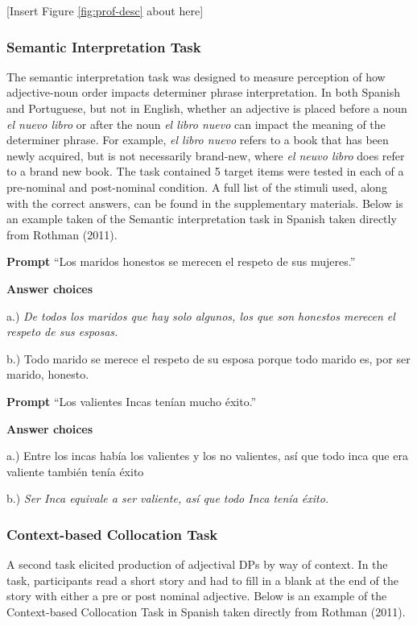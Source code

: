 \documentclass[
  man]{apa6}
\begin{document}
{[}Insert Figure \ref{fig:prof-desc} about here{]}

\hypertarget{semantic-interpretation-task}{%
\subsubsection{Semantic Interpretation Task}\label{semantic-interpretation-task}}

The semantic interpretation task was designed to measure perception of how adjective-noun order impacts determiner phrase interpretation.
In both Spanish and Portuguese, but not in English, whether an adjective is placed before a noun \emph{el nuevo libro} or after the noun \emph{el libro nuevo} can impact the meaning of the determiner phrase.
For example, \emph{el libro nuevo} refers to a book that has been newly acquired, but is not necessarily brand-new, where \emph{el neuvo libro} does refer to a brand new book.
The task contained 5 target items were tested in each of a pre-nominal and post-nominal condition.
A full list of the stimuli used, along with the correct answers, can be found in the supplementary materials.
Below is an example taken of the Semantic interpretation task in Spanish taken directly from Rothman (2011).

\textbf{Prompt}
``Los maridos honestos se merecen el respeto de sus mujeres.''

\textbf{Answer choices}

a.) \emph{De todos los maridos que hay solo algunos, los que son honestos merecen el respeto de sus esposas.}

b.) Todo marido se merece el respeto de su esposa porque todo marido es, por ser marido, honesto.

\textbf{Prompt}
``Los valientes Incas tenían mucho éxito.''

\textbf{Answer choices}

a.) Entre los incas había los valientes y los no valientes, así que todo inca que era valiente también tenía éxito

b.) \emph{Ser Inca equivale a ser valiente, así que todo Inca tenía éxito.}

\hypertarget{context-based-collocation-task}{%
\subsubsection{Context-based Collocation Task}\label{context-based-collocation-task}}

A second task elicited production of adjectival DPs by way of context.
In the task, participants read a short story and had to fill in a blank at the end of the story with either a pre or post nominal adjective.
Below is an example of the Context-based Collocation Task in Spanish taken directly from Rothman (2011).
\end{document}
